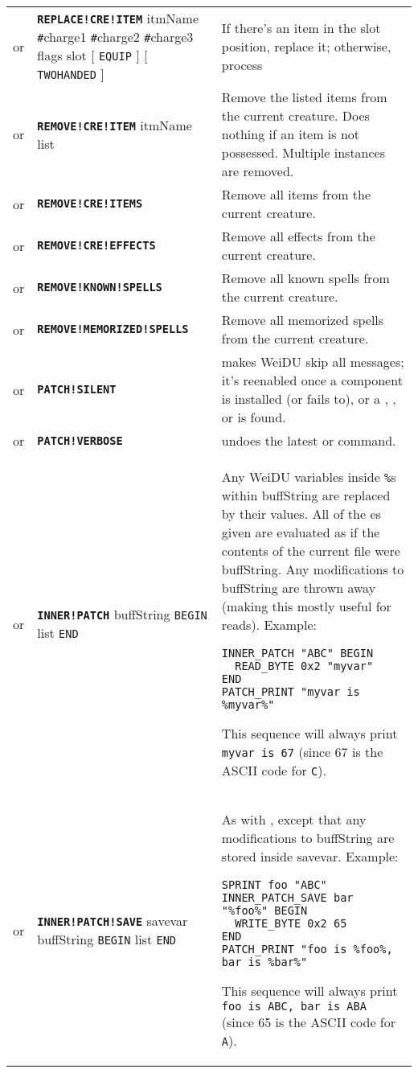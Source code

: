 \documentclass{article}
\def\ttref#1{\ahrefloc{#1}{\tt #1}}
\def\DEFINE#1{{\tt \bf #1}\label{#1}\index{#1}}
\def\t#1{{\tt #1}}
\def\Slist{{\color{red} list }}
\def\Ob{{\color{red} [ }}
\def\Oe{{\color{red} ] }}
\begin{document}
\begin{tabular}{cp{10in}|p{10in}}
or & \DEFINE{REPLACE!CRE!ITEM} itmName \t{\#}charge1 \t{\#}charge2 \t{\#}charge3 flags slot \Ob
\t{EQUIP} \Oe \Ob \t{TWOHANDED} \Oe &
  If there's an item in the slot position, replace it; otherwise, process \ttref{ADD!CRE!ITEM} \\

or & \DEFINE{REMOVE!CRE!ITEM} itmName \Slist &
  Remove the listed items from the current creature. Does nothing if an item is not possessed.
	Multiple instances are removed. \\

or & \DEFINE{REMOVE!CRE!ITEMS} &
  Remove all items from the current creature. \\
or & \DEFINE{REMOVE!CRE!EFFECTS} &
  Remove all effects from the current creature. \\
or & \DEFINE{REMOVE!KNOWN!SPELLS} &
  Remove all known spells from the current creature. \\
or & \DEFINE{REMOVE!MEMORIZED!SPELLS} &
  Remove all memorized spells from the current creature. \\
or & \DEFINE{PATCH!SILENT} & makes WeiDU skip all messages; it's reenabled once a component
    is installed (or fails to), or a \ttref{PRINT}, \ttref{PATCH!PRINT},
    \ttref{VERBOSE} or \ttref{PATCH!VERBOSE} is found. \\
or & \DEFINE{PATCH!VERBOSE} & undoes the latest \ttref{SILENT} or \ttref{PATCH!SILENT} command. \\

or & \DEFINE{INNER!PATCH} buffString \t{BEGIN} \ttref{patch} \Slist \t{END} &
  Any WeiDU variables inside \t{\%}s within buffString are replaced by
  their values. All of the \ttref{patch}es given are evaluated as if the
  contents of the current file were buffString. Any modifications to
  buffString are thrown away (making this mostly useful for reads).
  Example:
\begin{verbatim}
INNER_PATCH "ABC" BEGIN
  READ_BYTE 0x2 "myvar"
END
PATCH_PRINT "myvar is %myvar%"
\end{verbatim}
  This sequence will always print \t{myvar is 67} (since 67 is the ASCII
  code for \t{C}). \\

or & \DEFINE{INNER!PATCH!SAVE} savevar buffString \t{BEGIN} \ttref{patch} \Slist \t{END} &
  As with \ttref{INNER!PATCH}, except that any modifications to buffString are stored inside
  savevar.
  Example:
\begin{verbatim}
SPRINT foo "ABC"
INNER_PATCH_SAVE bar "%foo%" BEGIN
  WRITE_BYTE 0x2 65
END
PATCH_PRINT "foo is %foo%, bar is %bar%"
\end{verbatim}
  This sequence will always print \t{foo is ABC, bar is ABA } (since 65 is the ASCII
  code for \t{A}). \\



\end{tabular}
\end{document}
